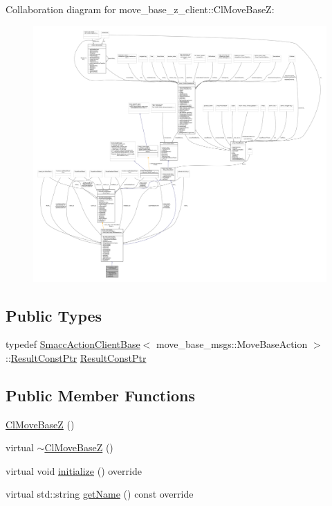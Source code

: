 Collaboration diagram for move\+\_\+base\+\_\+z\+\_\+client\+:\+:Cl\+Move\+BaseZ\+:\nopagebreak
\begin{figure}[H]
\begin{center}
\leavevmode
\includegraphics[width=350pt]{classmove__base__z__client_1_1ClMoveBaseZ__coll__graph}
\end{center}
\end{figure}
\subsection*{Public Types}
\begin{DoxyCompactItemize}
\item 
typedef \hyperlink{classsmacc_1_1client__bases_1_1SmaccActionClientBase_a942113f29871c3e2c3fff9e951500805}{Smacc\+Action\+Client\+Base}$<$ move\+\_\+base\+\_\+msgs\+::\+Move\+Base\+Action $>$\+::\hyperlink{classmove__base__z__client_1_1ClMoveBaseZ_a3b774d99d3dd4526f99b968d65ef5834}{Result\+Const\+Ptr} \hyperlink{classmove__base__z__client_1_1ClMoveBaseZ_a3b774d99d3dd4526f99b968d65ef5834}{Result\+Const\+Ptr}
\end{DoxyCompactItemize}
\subsection*{Public Member Functions}
\begin{DoxyCompactItemize}
\item 
\hyperlink{classmove__base__z__client_1_1ClMoveBaseZ_a98f9aec59e243cd7e464c0ae6b03ed2a}{Cl\+Move\+BaseZ} ()
\item 
virtual \hyperlink{classmove__base__z__client_1_1ClMoveBaseZ_ab5de84b969e58d80723f5c0d3ce79afa}{$\sim$\+Cl\+Move\+BaseZ} ()
\item 
virtual void \hyperlink{classmove__base__z__client_1_1ClMoveBaseZ_a082cef8bf5dbd0ec06adfe2a7aefbf70}{initialize} () override
\item 
virtual std\+::string \hyperlink{classmove__base__z__client_1_1ClMoveBaseZ_aa7446f57e3740d89c71ba12f1f3c00c0}{get\+Name} () const override
\end{DoxyCompactItemize}
